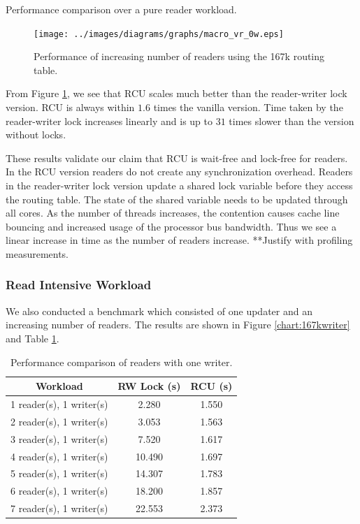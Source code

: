 \documentclass{article}
\begin{document}
\begin{table}[tph]
\begin{center}

\end{center}
\caption{Performance comparison over a pure reader workload.}
\label{chart:167kreader}
\end{table}

\begin{figure}[tph]
\texttt{[image: ../images/diagrams/graphs/macro\_vr\_0w.eps]}
\caption{Performance of increasing number of readers using the 167k routing table.}
\label{chart:167kreader}
\end{figure}

From Figure \ref{chart:167kreader}, we see that RCU scales much better
than the reader-writer lock version. RCU is always within $1.6$ times
the vanilla version. Time taken by the reader-writer lock increases
linearly and is up to $31$ times slower than the version without
locks.

These results validate our claim that RCU is wait-free and lock-free
for readers. In the RCU version readers do not create any
synchronization overhead. Readers in the reader-writer lock version
update a shared lock variable before they access the routing
table. The state of the shared variable needs to be updated through
all cores. As the number of threads increases, the contention causes
cache line bouncing and increased usage of the processor bus
bandwidth. Thus we see a linear increase in time as the number of
readers increase. **Justify with profiling measurements.

\subsubsection{Read Intensive Workload}
We also conducted a benchmark which consisted of one updater and an
increasing number of readers. The results are shown in Figure
\ref{chart:167kwriter} and Table \ref{tbl:167kwriter}.

\begin{table}[tph]
\begin{center}
\begin{tabular}{|c|c|c|}
\hline Workload & RW Lock (s) & RCU (s) \\
\hline 1 reader(s), 1 writer(s) & 2.280 & 1.550\\
\hline 2 reader(s), 1 writer(s) & 3.053 & 1.563\\
\hline 3 reader(s), 1 writer(s) & 7.520 & 1.617\\
\hline 4 reader(s), 1 writer(s) & 10.490 & 1.697\\
\hline 5 reader(s), 1 writer(s) & 14.307 & 1.783\\
\hline 6 reader(s), 1 writer(s) & 18.200 & 1.857\\
\hline 7 reader(s), 1 writer(s) & 22.553 & 2.373\\
\hline
\end{tabular}
\end{center}
\caption{Performance comparison of readers with one writer.}
\label{tbl:167kwriter}
\end{table}
\end{document}
